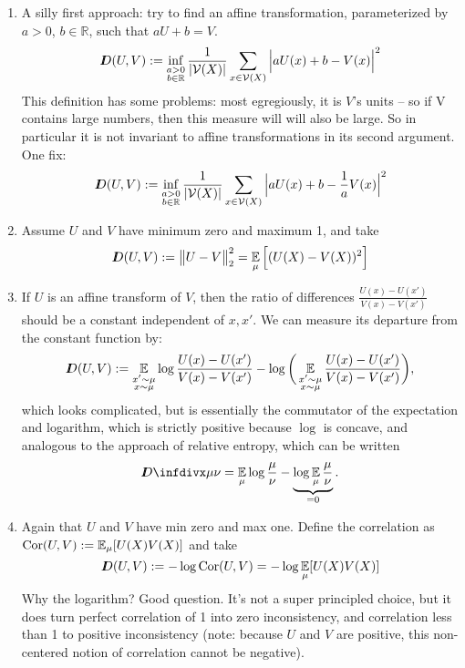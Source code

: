 \documentclass{article}
\begin{document}
    \begin{enumerate}
    \item A silly first approach: try to find an affine transformation, parameterized by $a > 0$, $b \in \mathbb R$, such that $a U + b = V$. 
     \begin{equation*}
        I\mkern-8muD(U, V) := \inf_{\substack{a > 0\\b \in \mathbb R}}  \frac{1}{|\mathcal V(X)|}\sum_{x \in \mathcal V(X)} \Big| a U(x) + b - V(x) \Big|^2
        \end{equation*}
        This definition has some problems: most egregiously, it is $V$'s units -- so if V contains large numbers, then this measure will will also be large. So in particular it is not invariant to affine transformations in its second argument. One fix:
        \[
        I\mkern-8muD(U, V) := \inf_{\substack{a > 0\\b \in \mathbb R}}  \frac{1}{|\mathcal V(X)|}\sum_{x \in \mathcal V(X)} \Big| a U(x) + b - \frac1a V(x) \Big|^2
        \]
    \item Assume $U$ and $V$ have minimum zero and maximum 1, and take 
    \[ I\mkern-8muD(U,V) := \big\Vert U - V \big\Vert^2_2 = \operatorname*{\mathbb{E}}_\mu \Big[(U(X) - V(X))^2\Big]  \]
    \item If $U$ is an affine transform of $V$, then the ratio of differences $\frac{U(x) - U(x')}{V(x)- V(x')}$ should be a constant independent of $x,x'$. We can measure its departure from the constant function by:
    \[
        I\mkern-8muD(U,V) := \operatorname*{\mathbb{E}}_{\substack{x' \sim \mu \\ x \sim \mu}} \log \frac{U(x) - U(x')}{V(x)- V(x')} - 
         \log \bigg(\operatorname*{\mathbb{E}}_{\substack{x' \sim \mu \\ x \sim \mu}}\frac{U(x) - U(x')}{V(x)- V(x')} \bigg),
    \]
    which looks complicated, but is essentially the commutator of the expectation and logarithm, which is strictly positive because $\log$ is concave, and analogous to the approach of relative entropy, which can be written 
    \[ \kldiv\mu\nu = \Ex_\mu \log \frac\mu\nu - \underbrace{\log \Ex_\mu \frac{\mu}{\nu}}_{=0}. \]

    \item Again that $U$ and $V$ have min zero and max one. Define the correlation as $\mathrm{Cor}(U,V) := \operatorname*{\mathbb{E}}_{\mu}[U(X)V(X)]$ and take 
    \[
        I\mkern-8muD(U,V) := - \log \mathrm{Cor}(U,V) = - \log \operatorname*{\mathbb{E}}_\mu [U(X) V(X)]
    \]
    Why the logarithm? Good question. It's not a super principled choice, but it does turn perfect correlation of 1 into zero inconsistency, and correlation less than 1 to positive inconsistency (note: because $U$ and $V$ are positive, this non-centered notion of correlation cannot be negative). 
\end{enumerate}
\end{document}
